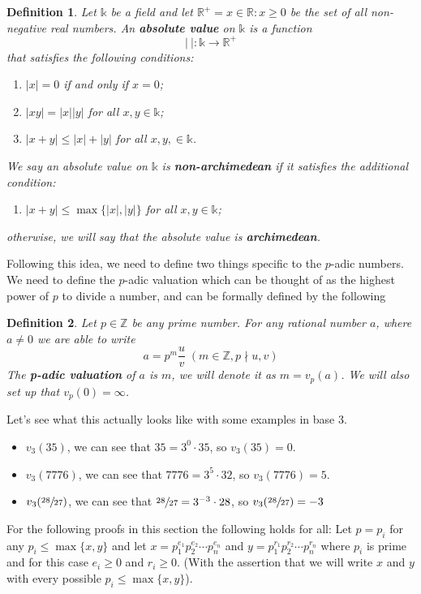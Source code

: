 \documentclass[11pt]{article}
\newtheorem{definition}{Definition}[section]
\newcommand{\Z}{\mathbb{Z}}
\newcommand{\R}{\mathbb{R}}
\newcommand{\ndiv}{\nmid}
\newcommand{\padic}{$p$-adic }
\newcommand{\bpadic}{p-adic }
\begin{document}
\begin{definition}\label{abs}
  Let $\mathds{k}$ be a field and let $\R^+ = {x \in \R : x \geq 0}$ be the set of all non-negative
  real numbers.
  An \textbf{absolute value} on $\mathds{k}$ is a function
  $$ |~| : \mathds{k} \rightarrow \R^+  $$
  that satisfies the following conditions:
  \renewcommand{\labelenumi}{\roman{enumi}) }
  \begin{enumerate}
    \item $|x|=0$ if and only if $x=0$;
    \item $|xy|=|x||y|$ for all $x,y\in \mathds{k}$;
    \item $|x+y|\leq |x|+|y|$ for all $x,y,\in \mathds{k}$.
  \end{enumerate}
  We say an absolute value on $\mathds{k}$ is \textbf{non-archimedean} if it satisfies the additional condition:
  \begin{enumerate}
    \item[iv) ] $|x+y|\leq \max\{|x|,|y|\}$ for all $x,y \in \mathds{k}$;
  \end{enumerate}
  otherwise, we will say that the absolute value is \textbf{archimedean}.
\end{definition}

Following this idea, we need to define two things specific to the \padic numbers.
We need to define the \padic valuation which can be thought of as the highest power of $p$ to divide a number, and can be formally defined by the following
\begin{definition}\label{valuation}
  Let $p\in\Z$ be any prime number. For any rational number $a$, where $a\neq 0$ we are able to write
  \[
    a = p^m \frac{u}{v} \; (m\in\Z, p\ndiv u,v)
  \]
  The \textbf{\bpadic valuation} of $a$ is $m$, we will denote it as $m = v_p(a)$. We will also set up that $v_p(0)=\infty$.
\end{definition}

Let's see what this actually looks like with some examples in base 3.
\begin{itemize}
  \item $v_3(35)$, we can see that $35=3^{0} \cdot 35$, so $v_3(35)=0$.
  \item $v_3(7776)$, we can see that $7776=3^5\cdot 32$, so $v_3(7776)=5$.
  \item $v_3(\sfrac{28}{27})$, we can see that $\sfrac{28}{27} = 3^{-3}\cdot 28$, so $v_3(\sfrac{28}{27})=-3$
\end{itemize}

For the following proofs in this section the following holds for all: Let $p=p_i$ for any $p_i\leq \max\{x,y\}$ and let $x=p_1^{e_1}p_2^{e_2}\cdots p_n^{e_n}$ and $y=p_1^{r_1}p_2^{r_2}\cdots p_n^{r_n}$ where $p_i$ is prime and for this case $e_i\geq 0$ and $r_i\geq 0$. (With the assertion that we will write $x$ and $y$ with every possible $p_i\leq \max\{x,y\}$).
\end{document}
